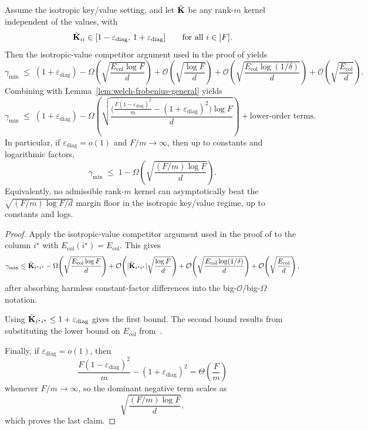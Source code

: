 \begin{corollary}
\label{cor:rank-m-unbeatable-iso}
Assume the isotropic key/value setting, and let $\hat{\mathbf{K}}$ be any rank-$m$ kernel independent of
the values, with
\[
\hat{\mathbf{K}}_{ii}\in[1-\varepsilon_{\mathrm{diag}},\,1+\varepsilon_{\mathrm{diag}}]
\qquad\text{for all } i\in[F].
\]
Then the isotropic-value competitor argument used in the proof of  yields
\[
\gamma_{\min}
\;\le\;
(1+\varepsilon_{\mathrm{diag}})
-
\Omega\!\left(
\sqrt{\frac{E_{\mathrm{col}}\log F}{d}}
\right)
+
\mathcal{O}\!\left(
\sqrt{\frac{\log F}{d}}
\right)
+
\mathcal{O}\!\left(
\sqrt{\frac{E_{\mathrm{col}}\log(1/\delta)}{d}}
\right)
+
\mathcal{O}\!\left(
\sqrt{\frac{E_{\mathrm{col}}}{d}}
\right).
\]
Combining with Lemma~\ref{lem:welch-frobenius-general} yields
\[
\gamma_{\min}
\;\le\;
(1+\varepsilon_{\mathrm{diag}})
-
\Omega\!\left(
\sqrt{
\frac{\big(\frac{F(1-\varepsilon_{\mathrm{diag}})^2}{m}-(1+\varepsilon_{\mathrm{diag}})^2\big)\log F}{d}
}
\right)
+ \text{lower-order terms}.
\]
In particular, if $\varepsilon_{\mathrm{diag}}=o(1)$ and $F/m\to\infty$, then up to constants and
logarithmic factors,
\[
\gamma_{\min}
\;\le\;
1 - \Omega\!\left(\sqrt{\frac{(F/m)\log F}{d}}\right).
\]
Equivalently, no admissible rank-$m$ kernel can asymptotically beat the
$\sqrt{(F/m)\log F / d}$ margin floor in the isotropic key/value regime, up to constants and logs.
\end{corollary}

\begin{proof}
Apply the isotropic-value competitor argument used in the proof of  to
the column $i^\star$ with $E_{\mathrm{col}}(i^\star)=E_{\mathrm{col}}$. This gives
\[
\gamma_{\min}
\le
\hat{\mathbf{K}}_{i^\star i^\star}
-
\Omega\!\left(
\sqrt{\frac{E_{\mathrm{col}}\log F}{d}}
\right)
+
\mathcal{O}\!\left(
|\hat{\mathbf{K}}_{i^\star i^\star}|\sqrt{\frac{\log F}{d}}
\right)
+
\mathcal{O}\!\left(
\sqrt{\frac{E_{\mathrm{col}}\log(1/\delta)}{d}}
\right)
+
\mathcal{O}\!\left(
\sqrt{\frac{E_{\mathrm{col}}}{d}}
\right),
\]
after absorbing harmless constant-factor differences into the big-$\mathcal{O}$/big-$\Omega$
notation.

Using $\hat{\mathbf{K}}_{i^\star i^\star}\le 1+\varepsilon_{\mathrm{diag}}$ gives the first bound.
The second bound results from substituting the lower bound on $E_{\mathrm{col}}$ from~.

Finally, if $\varepsilon_{\mathrm{diag}}=o(1)$, then
\[
\frac{F(1-\varepsilon_{\mathrm{diag}})^2}{m}
-
(1+\varepsilon_{\mathrm{diag}})^2
=
\Theta\!\left(\frac{F}{m}\right)
\]
whenever $F/m\to\infty$, so the dominant negative term scales as
\[
\sqrt{\frac{(F/m)\log F}{d}},
\]
which proves the last claim.
\end{proof}

